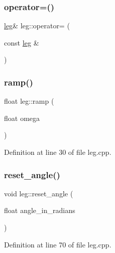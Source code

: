 \mbox{\label{classleg_ad689d8f971733486c26cc2df5b740bc2}} 
\subsubsection{\texorpdfstring{operator=()}{operator=()}\hspace{0.1cm}{\footnotesize\ttfamily [2/2]}}
{\footnotesize\ttfamily \mbox{\hyperlink{classleg}{leg}}\& leg\+::operator= (\begin{DoxyParamCaption}\item[{const \mbox{\hyperlink{classleg}{leg}} \&}]{ }\end{DoxyParamCaption})\hspace{0.3cm}{\ttfamily [default]}}

\mbox{\label{classleg_a1e9f431f413985c7ea307fc13fc5b42f}} 
\subsubsection{\texorpdfstring{ramp()}{ramp()}}
{\footnotesize\ttfamily float leg\+::ramp (\begin{DoxyParamCaption}\item[{float}]{omega }\end{DoxyParamCaption})}



Definition at line 30 of file leg.\+cpp.

\mbox{\label{classleg_add86097d69f6780c1c651693aac6fa4e}} 
\subsubsection{\texorpdfstring{reset\_angle()}{reset\_angle()}}
{\footnotesize\ttfamily void leg\+::reset\+\_\+angle (\begin{DoxyParamCaption}\item[{float}]{angle\+\_\+in\+\_\+radians }\end{DoxyParamCaption})}



Definition at line 70 of file leg.\+cpp.

